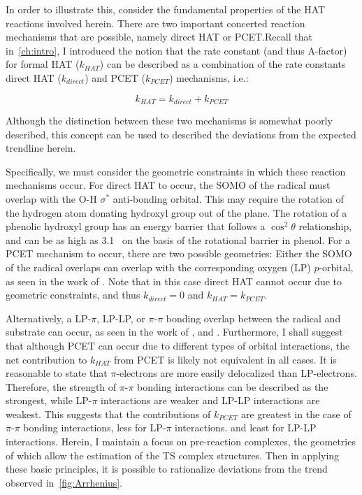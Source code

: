 In order to illustrate this, consider the fundamental properties of the HAT reactions involved herein. There are two important concerted reaction mechanisms that are possible, namely direct HAT or PCET.\@ Recall that in~\ref{ch:intro}, I introduced the notion that the rate constant (and thus A-factor) for formal HAT ($k_{HAT}$) can be described as a combination of the rate constants direct HAT ($k_{direct}$) and PCET ($k_{PCET}$) mechanisms, i.e.:

\begin{equation}
  k_{HAT} = k_{direct} + k_{PCET}
\end{equation}

\noindent Although the distinction between these two mechanisms is somewhat poorly described, this concept can be used to described the deviations from the expected trendline herein.

Specifically, we must consider the geometric constraints in which these reaction mechanisms occur. For direct HAT to occur, the SOMO of the radical must overlap with the O-H $\sigma^*$ anti-bonding orbital. This may require the rotation of the hydrogen atom donating hydroxyl group out of the plane. The rotation of a phenolic hydroxyl group has an energy barrier that follows a $\cos^2 \theta$ relationship,\cite{Kojima1960} and can be as high as 3.1 \kcalmol\ on the basis of the rotational barrier in phenol.\cite{Kim1994} For a PCET mechanism to occur, there are two possible geometries: Either the SOMO of the radical overlaps can overlap with the corresponding oxygen (LP) $p$-orbital, as seen in the work of \citet{Mayer2002}. Note that in this case direct HAT cannot occur due to geometric constraints, and thus $k_{direct} = 0$ and $k_{HAT} = k_{PCET}$.

Alternatively, a LP-$\pi$, LP-LP, or $\pi$-$\pi$ bonding overlap between the radical and substrate can occur, as seen in the work of \citet{DiLabio2005}, and \citet{DiLabio2007}. Furthermore, I shall suggest that although PCET can occur due to different types of orbital interactions, the net contribution to $k_{HAT}$ from PCET is likely not equivalent in all cases. It is reasonable to state that $\pi$-electrons are more easily delocalized than LP-electrons. Therefore, the strength of $\pi$-$\pi$ bonding interactions can be described as the strongest, while LP-$\pi$ interactions are weaker and LP-LP interactions are weakest. This suggests that the contributions of $k_{PCET}$ are greatest in the case of $\pi$-$\pi$ bonding interactions, less for LP-$\pi$ interactions. and least for LP-LP interactions. Herein, I maintain a focus on pre-reaction complexes, the geometries of which allow the estimation of the TS complex structures. Then in applying these basic principles, it is possible to rationalize deviations from the trend observed in~\ref{fig:Arrhenius}.

